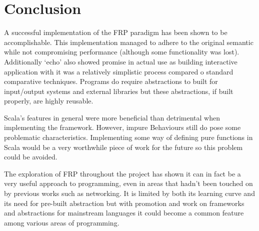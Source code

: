 \chapter{Conclusion}

A successful implementation of the FRP paradigm has been shown to be accomplishable. This implementation
managed to adhere to the original semantic while not compromising performance (although some functionality was
lost). Additionally `echo' also showed promise in actual use as building interactive application with it
was a relatively simplistic process compared o standard comparative techniques. Programs do require abstractions
to built for input/output systems and external libraries but these abstractions, if built properly, are highly
reusable.

Scala's features in general were more beneficial than detrimental when implementing the framework. However,
impure Behaviours still do pose some problematic characteristics. Implementing some way of defining pure functions
in Scala would be a very worthwhile piece of work for the future so this problem could be avoided.

The exploration of FRP throughout the project has shown it can in fact be a very useful approach to programming,
even in areas that hadn't been touched on by previous works such as networking. It is limited by
both its learning curve and its need for pre-built abstraction but with promotion and work on frameworks
and abstractions for mainstream languages it could become a common feature among various areas of programming.